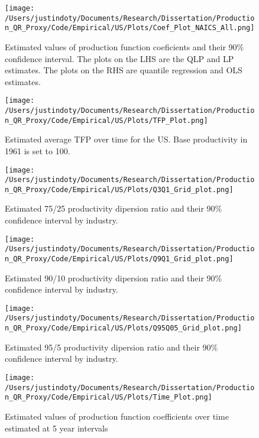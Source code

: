 \documentclass[11pt]{article}
\begin{document}
\begin{figure}[H]
\centering
\texttt{[image: /Users/justindoty/Documents/Research/Dissertation/Production\_QR\_Proxy/Code/Empirical/US/Plots/Coef\_Plot\_NAICS\_All.png]}
\caption{Estimated values of production function coeficients and their 90\% confidence interval. The plots on the LHS are the QLP and LP estimates. The plots on the RHS are quantile regression and OLS estimates.}
\end{figure}

\begin{figure}[H]
\centering
\texttt{[image: /Users/justindoty/Documents/Research/Dissertation/Production\_QR\_Proxy/Code/Empirical/US/Plots/TFP\_Plot.png]}
\caption{Estimated average TFP over time for the US. Base productivity in 1961 is set to 100.}
\end{figure}

\begin{figure}[H]
\centering
\texttt{[image: /Users/justindoty/Documents/Research/Dissertation/Production\_QR\_Proxy/Code/Empirical/US/Plots/Q3Q1\_Grid\_plot.png]}
\caption{Estimated 75/25 productivity dipersion ratio and their 90\% confidence interval by industry.}
\end{figure}

\begin{figure}[H]
\centering
\texttt{[image: /Users/justindoty/Documents/Research/Dissertation/Production\_QR\_Proxy/Code/Empirical/US/Plots/Q9Q1\_Grid\_plot.png]}
\caption{Estimated 90/10 productivity dipersion ratio and their 90\% confidence interval by industry.}
\end{figure}

\begin{figure}[H]
\centering
\texttt{[image: /Users/justindoty/Documents/Research/Dissertation/Production\_QR\_Proxy/Code/Empirical/US/Plots/Q95Q05\_Grid\_plot.png]}
\caption{Estimated 95/5 productivity dipersion ratio and their 90\% confidence interval by industry.}
\end{figure}

\begin{figure}[H]
\centering
\texttt{[image: /Users/justindoty/Documents/Research/Dissertation/Production\_QR\_Proxy/Code/Empirical/US/Plots/Time\_Plot.png]}
\caption{Estimated values of production function coefficients over time estimated at 5 year intervals}
\end{figure}


\end{document}
